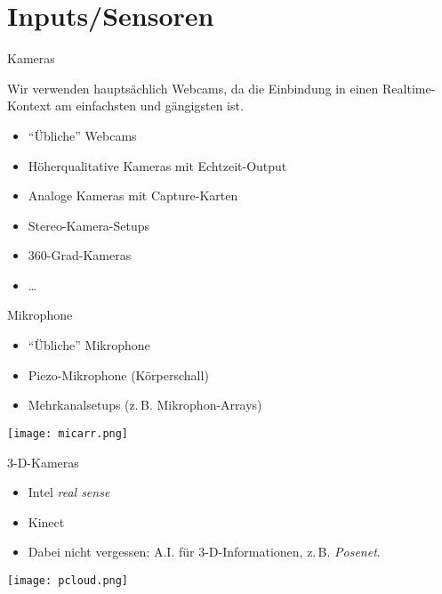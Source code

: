 \section{Inputs/Sensoren}
 \frame{\sectionpage}

\begin{frame}{Kameras}

Wir verwenden hauptsächlich Webcams, da die Einbindung in einen Realtime-Kontext am einfachsten und gängigsten ist.

\begin{itemize}
	\item "`Übliche"' Webcams
	\item Höherqualitative Kameras mit Echtzeit-Output
	\item Analoge Kameras mit Capture-Karten
	\item Stereo-Kamera-Setups
	\item 360-Grad-Kameras
	\item \dots{}
\end{itemize}

\end{frame}


\begin{frame}{Mikrophone}
\begin{itemize}
	\item "`Übliche"' Mikrophone
	\item Piezo-Mikrophone (Körperschall)
	\item Mehrkanalsetups (z.\,B. Mikrophon-Arrays)
\end{itemize}
\texttt{[image: micarr.png]}

\end{frame}


\begin{frame}{3-D-Kameras}
\begin{itemize}
	\item Intel \emph{real sense}
	\item Kinect
	\item Dabei nicht vergessen: A.I. für 3-D-Informationen, z.\,B. \emph{Posenet}.
\end{itemize}
\texttt{[image: pcloud.png]}
\end{frame}

